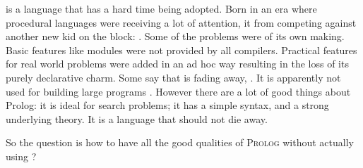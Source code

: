 \documentclass[thesis-solanki.tex]{subfiles}
\begin{document}
\begin{comment}
\par \progLang{Prolog} has a similar story. It was born in an era where procedural programming had made everyone notice their presence. Talking about 
competition, it was against something radical; the \progLang{C} programming language. The languages \progLang{C} has influenced is off the chart and 
so is the performance. It had paved the way for structured procedural programming and had given birth to the Unix operating system. Though the 
original version of \progLang{Prolog} has given rise to a large number of different flavours but a few drawbacks remain through the bloodline and as a 
result it did become the first choice. Some basic requirements such as modules are not provided by all compilers. To make it do real world stuff, a set of 
practical features are pushed in now and then which results in the loss of the purely declarative charm. The problem is that \progLang{Prolog} is fading 
away, \cite{website:prolog-steam,website:prolog-death,website:prolog-killer}, not many people use it and most of the times when it is used, the variant 
is usually \textit{practical} \progLang{Prolog} and the area being academia. It is not used for building large programs \cite{wikiprolog,somogyi1995
logic,website:prolog1000db}. But there are a lot of good things about \progLang{Prolog} that should not die away. Moreover, \progLang{Prolog} is ideal 
for search problems. 
\end{comment}

 is a language that has a hard time being adopted.
Born in an era where procedural languages were receiving a lot of attention, it  from competing against another
new kid on the block: .
Some of the problems were of its own making.
Basic features like modules were not provided by all compilers.
Practical features for real world problems were added in an ad hoc way resulting in the loss of its purely declarative
charm.
Some say that  is fading away, \cite{website:prolog-steam,website:prolog-death,website:prolog-killer}.
It is apparently not used for building large programs \cite{wikiprolog,somogyi1995logic,website:prolog1000db}.
However there are a lot of good things about Prolog: it is ideal for search problems; it has a simple syntax, and a
strong underlying theory.
It is a language that should not die away.

So the question is how to have all the good qualities of \textsc{Prolog} without actually using ?  
\end{document}
